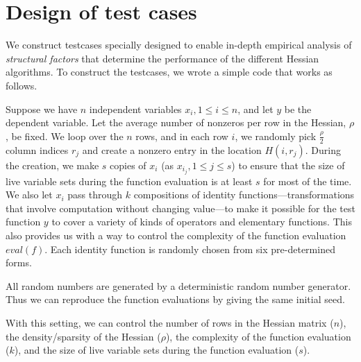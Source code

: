 \documentclass[10pt, a4paper, english]{article}
\begin{document}
\section*{Design of test cases}

We construct testcases specially designed to enable in-depth empirical analysis of {\em structural factors} that determine the performance of the  different Hessian algorithms. 
To construct the testcases, we wrote a simple code that works as follows. 

Suppose we have $n$ independent variables $x_i, 1 \le i \le n$, and let $y$ be the dependent variable. Let the average number of nonzeros per row in the Hessian, $\rho$, be fixed. 
We loop over the $n$ rows, and in each row $i$, we randomly pick $\frac{\rho}{2}$ column indices $r_j$ and create a nonzero entry in the location $H(i,r_{j})$. During the creation, we make $s$ copies of $x_i$ (as $x_{i_j}, 1 \le j \le s$) to ensure that the size of live variable sets during the function evaluation is at least $s$ for most of the time. We also let $x_i$ pass through $k$ compositions of identity functions---transformations that involve computation without changing value---to make it possible for the test function $y$ to cover a variety of kinds of operators and elementary functions. This also provides us with a way to control the complexity of the function evaluation $eval(f)$. Each identity function is randomly chosen from six pre-determined forms. 

All random numbers are generated by a deterministic random number generator. Thus we can reproduce the function evaluations by giving the same initial seed.

With this setting, we can control the number of rows in the Hessian matrix ($n$), the density/sparsity of the Hessian ($\rho$), the complexity of the function evaluation ($k$), and the size of live variable sets during the function evaluation ($s$).
\end{document}
